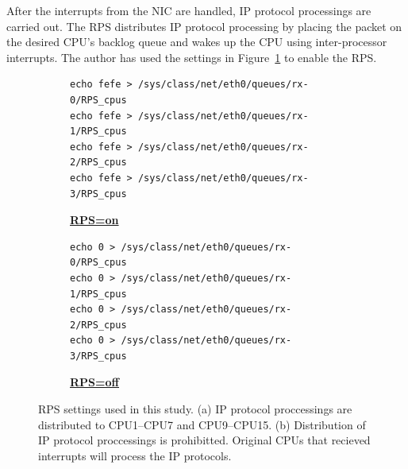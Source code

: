 After the interrupts from the NIC are handled, IP protocol processings are carried out.
The RPS distributes IP protocol processing by placing the packet
on the desired CPU's backlog queue and wakes up the CPU using inter-processor interrupts.
The author has used the settings in Figure~\ref{fig:rps=on} to enable the RPS.

\begin{figure}[h]

  \begin{subfigure}[t]{\columnwidth}
    \centering
    \begin{minipage}{0.9\columnwidth}
\begin{verbatim}
echo fefe > /sys/class/net/eth0/queues/rx-0/RPS_cpus
echo fefe > /sys/class/net/eth0/queues/rx-1/RPS_cpus
echo fefe > /sys/class/net/eth0/queues/rx-2/RPS_cpus
echo fefe > /sys/class/net/eth0/queues/rx-3/RPS_cpus
\end{verbatim}
    \end{minipage}
    \caption{\underline{\textbf{RPS=on}}}
    \label{fig:rps=on}
  \end{subfigure}

  \par\bigskip

  \begin{subfigure}[t]{\columnwidth}
    \centering
    \begin{minipage}{0.9\columnwidth}
\begin{verbatim}
echo 0 > /sys/class/net/eth0/queues/rx-0/RPS_cpus
echo 0 > /sys/class/net/eth0/queues/rx-1/RPS_cpus
echo 0 > /sys/class/net/eth0/queues/rx-2/RPS_cpus
echo 0 > /sys/class/net/eth0/queues/rx-3/RPS_cpus
\end{verbatim}
    \end{minipage}
    \caption{\underline{\textbf{RPS=off}}}
    \label{fig:rps=off}
  \end{subfigure}

  \par\bigskip
  \centering
  \begin{minipage}{0.9\columnwidth}
    \caption[RPS settings]{
      RPS settings used in this study.
      (a) IP protocol proccessings are distributed to CPU1--CPU7 and CPU9--CPU15.
      (b) Distribution of IP protocol proccessings is prohibitted.
      Original CPUs that recieved interrupts will process the IP protocols.
    }
    \label{fig:rps_settings}
  \end{minipage}

  \par\bigskip
\end{figure}

